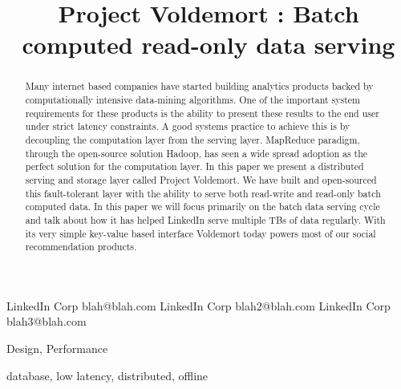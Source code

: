 \documentclass[10pt,twocolumn,preprint,natbib,authoryear]{sigplanconf}
\begin{document}
\copyrightdata{[to be supplied]} 


\title{Project Voldemort : Batch computed read-only data serving}

           {LinkedIn Corp}
           {blah@blah.com}
           {LinkedIn Corp}
           {blah2@blah.com}
		   {LinkedIn Corp}
		   {blah3@blah.com}
				
\maketitle

\begin{abstract}
Many internet based companies have started building analytics products backed by computationally intensive data-mining algorithms. One of the important system requirements for these products is the ability to present these results to the end user under strict latency constraints. A good systems practice to achieve this is by decoupling the computation layer from the serving layer. MapReduce paradigm, through the open-source solution Hadoop, has seen a wide spread adoption as the perfect solution for the computation layer. In this paper we present a distributed serving and storage layer called Project Voldemort. We have built and open-sourced this fault-tolerant layer with the ability to serve both read-write and read-only batch computed data. In this paper we will focus primarily on the batch data serving cycle and talk about how it has helped LinkedIn serve multiple TBs of data regularly. With its very simple key-value based interface Voldemort today powers most of our social recommendation products. 
\end{abstract}


\terms
Design, Performance

\keywords
database, low latency, distributed, offline
\end{document}
